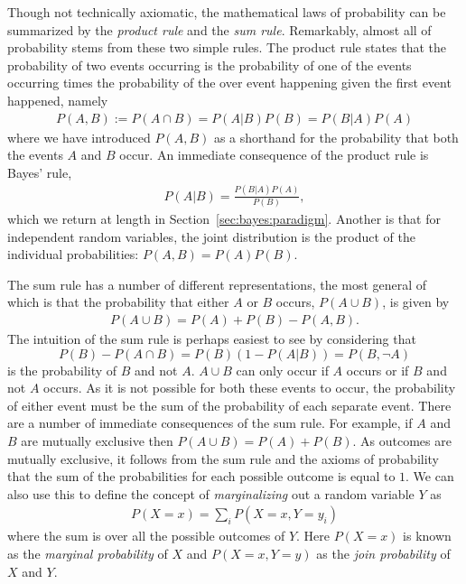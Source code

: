 Though not technically axiomatic, the mathematical laws of probability can be summarized by the \emph{product rule}
and the \emph{sum rule}.  Remarkably, almost all of probability stems from these two simple rules.
The product rule states that the probability of two events occurring is the probability of one of the events
occurring times the probability of the over event happening given the first event happened, namely
\begin{align}
\label{eq:prob:prod}
P(A,B) := P(A \cap B) = P(A|B) P(B) =  P(B|A) P(A)
\end{align}
where we have introduced $P(A,B)$ as a shorthand for the probability that both the events $A$ and $B$ occur.
An immediate consequence of the product rule is Bayes' rule,
\begin{align}
P(A|B) = \frac{P(B|A)P(A)}{P(B)},
\end{align}
which we return at length in Section~\ref{sec:bayes:paradigm}.
Another is that for independent random variables, the joint distribution is the product of the
individual probabilities: $P(A,B)=P(A)P(B)$.

The sum rule has a number of different representations, the most general of which is that 
the probability that either $A$ or $B$ occurs, $P(A\cup B)$, is given by
\begin{align}
\label{eq:prob:sum}
P(A\cup B) = P(A) + P(B) - P(A, B).
\end{align}
The intuition of the sum rule is perhaps easiest to see by considering that
\[
P(B) - P(A \cap B) = P(B)(1-P(A|B)) = P(B, \neg A)
\]
 is the probability of $B$ and 
not $A$.  $A\cup B$ can only occur if $A$ occurs or if $B$ and not $A$ occurs.  As it is not
possible for both these events to occur, the probability of either event must be the sum of the
probability of each separate event.
There are a number of immediate consequences of the sum rule.  For example, if $A$ and $B$ are
mutually exclusive then $P(A\cup B) = P(A) + P(B)$.  As outcomes are mutually exclusive, it
follows from the sum rule and the axioms of probability that the sum of the probabilities
for each possible outcome is equal to $1$.  We can also use this to
define the concept of \emph{marginalizing} out a random variable $Y$ as
\begin{align}
\label{eq:prob:marginal}
P(X=x) = \sum_{i} P(X=x,Y=y_i)
\end{align}
where the sum is over all the possible outcomes of $Y$.  Here $P(X=x)$ is known as the
\emph{marginal probability} of $X$ and $P(X=x,Y=y)$ as the \emph{join probability} of $X$
and $Y$.

